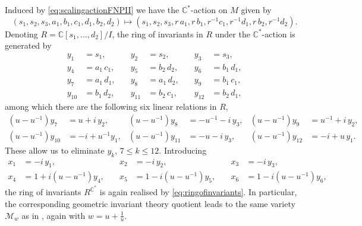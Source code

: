 \documentclass[a4paper,reqno]{amsart}
\numberwithin{equation}{section}
\newcommand{\C}{\mathbb{C}}
\numberwithin{equation}{section}
\begin{document}
Induced by \eqref{eq:scalingactionFNPII} we have the $\C^*$-action on $M$ given by 
\begin{equation*}
(s_1,s_2,s_3,a_1,b_1,c_1,d_1,b_2,d_2)\mapsto (s_1,s_2,s_3,r\,a_1,r\,b_1,r^{-1}c_1,r^{-1}d_1,r\,b_2,r^{-1}d_2).
\end{equation*}
Denoting $R=\C[s_1,\dots,d_2]/I$, the ring of invariants in $R$ under the $\C^*$-action is generated by 
\begin{equation*}
    \begin{aligned}
    y_1 &= s_1, &\quad y_2 &= s_2, &\quad y_3 &= s_3, \\
    y_4 &= a_1\, c_1, &\quad y_5 &= b_2\,d_2, &\quad y_6 &= b_1\, d_1, \\
    y_7 &= a_1\, d_1, &\quad y_8 &= a_1\,d_2, &\quad y_9 &= b_1\, c_1,\\
    y_{10} &= b_1\,d_2, &\quad y_{11} &= b_2 \, c_1, &\quad y_{12} &= b_2\, d_1,
    \end{aligned}
\end{equation*}
among which there are the following six linear relations in $R$,
\begin{equation*}
\begin{aligned}
    (u-u^{-1})y_7&=u+i\,y_2, & (u-u^{-1})y_8&=-u^{-1}-i\,y_3, & (u-u^{-1})y_9&=u^{-1}+i\,y_2,\\
     (u-u^{-1})y_{10}&=-i+u^{-1}y_1, & (u-u^{-1})y_{11}&=-u-i\,y_3, & (u-u^{-1})y_{12}&=-i+u\,y_1.
\end{aligned}
\end{equation*}
These allow us to eliminate $y_k$, $7\leq k\leq 12$. Introducing 
\begin{equation*}
    \begin{aligned}
    x_1&=-i\,y_1, &\quad 
    x_2&=-i\,y_2, &\quad 
    x_3&=-i\,y_3, \\
    x_4&=1+i(u-u^{-1})y_4, &\quad 
    x_5&=1-i(u-u^{-1})y_5, &\quad 
    x_6&=1-i(u-u^{-1})y_6,
    \end{aligned}
\end{equation*}
the ring of invariants $R^{\C^*}$ is again realised by \eqref{eq:ringofinvariants}. In particular, the corresponding geometric invariant theory quotient leads to the same variety $\mathcal{M}_w$ as in , again with $w=u+\tfrac{1}{u}$.






 
\end{document}
